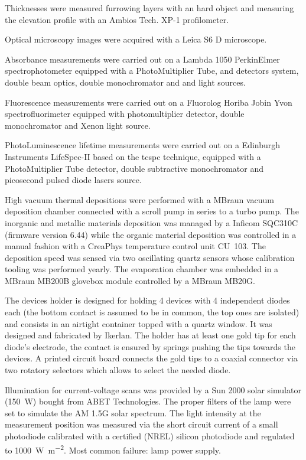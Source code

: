 	 Thicknesses were measured furrowing layers with an hard object and measuring the elevation profile with an Ambios Tech. XP-1 profilometer.

	 Optical microscopy images were acquired with a Leica S6 D microscope.
	
	 Absorbance measurements were carried out on a Lambda 1050 PerkinElmer spectrophotometer equipped with a PhotoMultiplier Tube,  and  detectors system, double beam optics, double monochromator and  and  light sources.
	
	 Fluorescence measurements were carried out on a Fluorolog Horiba Jobin Yvon spectrofluorimeter equipped with photomultiplier detector, double monochromator and	Xenon light source.

	 PhotoLuminescence lifetime measurements were carried out on a Edinburgh Instruments LifeSpec-II based on the \gls{tcspc} technique, equipped with a PhotoMultiplier Tube detector, double subtractive monochromator and picosecond pulsed diode lasers source.
	
	 High vacuum thermal depositions were performed with a MBraun vacuum deposition chamber connected with a scroll pump in series to a turbo pump. The inorganic and metallic materials deposition was managed by a Inficom SQC310C (firmware version 6.44) while the organic material deposition was controlled in a manual fashion with a CreaPhys temperature control unit CU~103. The deposition speed was sensed via two oscillating quartz sensors whose calibration tooling was performed yearly. The evaporation chamber was embedded in a MBraun MB200B glovebox module controlled by a MBraun MB20G.

	 The devices holder is designed for holding 4 devices with 4 independent diodes each (the bottom contact is assumed to be in common, the top ones are isolated) and consists in an airtight container topped with a quartz window. It was designed and fabricated by Ikerlan. The holder has at least one gold tip for each diode's electrode, the contact is ensured by springs pushing the tips towards the devices. A printed circuit board connects the gold tips to a coaxial connector via two rotatory selectors which allows to select the needed diode.

	\label{solarsimulator}Illumination for current-voltage scans was provided by a Sun 2000 solar simulator (\SI{150}{\W}) bought from ABET Technologies. The proper filters of the lamp were set to simulate the AM 1.5G solar spectrum. The light intensity at the measurement position was measured via the short circuit current of a small photodiode calibrated with a certified (NREL) silicon photodiode and regulated to \SI{1000}{\W\per\m\squared}. Most common failure: lamp power supply.

